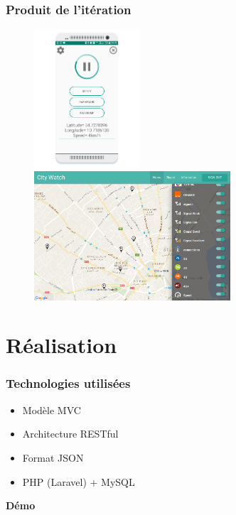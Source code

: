 \documentclass{beamer}
\begin{document}
\begin{frame}
    \frametitle{Produit de l'itération}
    \begin{figure}
        \includegraphics[width=0.35\textwidth]{./figures/sprint3-android-screenshot2}
        \includegraphics[width=0.65\textwidth]{./figures/sprint3-dashboard-screenshot1}
    \end{figure}
\end{frame}

\section{Réalisation}

\begin{frame}
    \frametitle{Technologies utilisées}
    \begin{itemize}
        \item Modèle MVC
        \item Architecture RESTful
        \item Format JSON
        \item PHP (Laravel) + MySQL
    \end{itemize}
\end{frame}

\begin{frame}
    \begin{center}
        \textbf{\Huge Démo}
    \end{center}
\end{frame}
\end{document}
